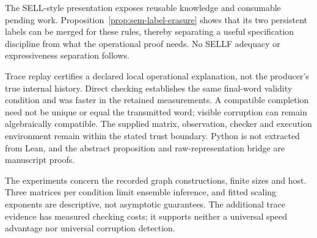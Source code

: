 \documentclass{lmcs}
\begin{document}
The SELL-style presentation exposes reusable knowledge and consumable
pending work. Proposition~\ref{prop:sem-label-erasure} shows that its two
persistent labels can be merged for these rules, thereby separating a
useful specification discipline from what the operational proof needs.
No SELLF adequacy or expressiveness separation follows.

Trace replay certifies a declared local operational explanation, not the
producer's true internal history. Direct checking establishes the same
final-word validity condition and was faster in the retained measurements.
A compatible completion need not be unique or equal the transmitted word;
visible corruption can remain algebraically compatible. The supplied
matrix, observation, checker and execution environment remain within the
stated trust boundary. Python is not extracted from Lean, and the abstract
proposition and raw-representation bridge are manuscript proofs.

The experiments concern the recorded graph constructions, finite sizes
and host. Three matrices per condition limit ensemble inference, and
fitted scaling exponents are descriptive, not asymptotic guarantees.
The additional trace evidence has measured checking costs; it supports
neither a universal speed advantage nor universal corruption detection.



\end{document}
